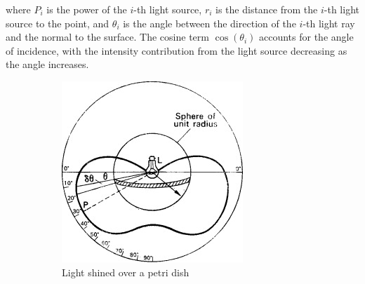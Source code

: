 where $P_i$ is the power of the $i$-th light source, $r_i$ is the distance from the $i$-th light source to the point, and $\theta_i$ is the angle between the direction of the $i$-th light ray and the normal to the surface. The cosine term $\cos(\theta_i)$ accounts for the angle of incidence, with the intensity contribution from the light source decreasing as the angle increases.




\begin{figure}
    \centering
    \begin{subfigure}{.5\textwidth}
        \centering
        \includegraphics[width=\linewidth]{sphere2.jpg}
        \caption{Light shined over a petri dish}
        \label{fig:light-over-petri}
    \end{subfigure}%
    \begin{subfigure}{.5\textwidth}
        \centering

\end{subfigure}
\end{figure}
